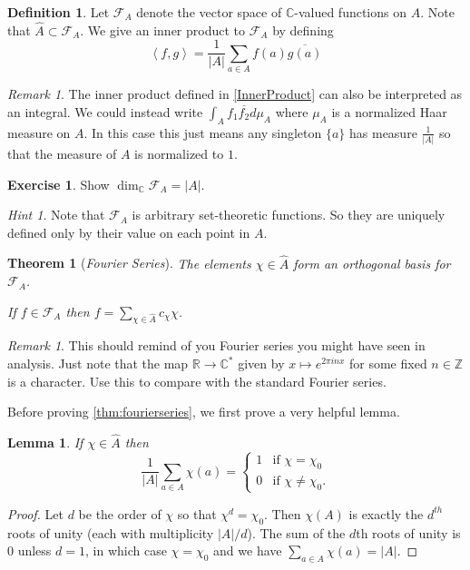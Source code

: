 \documentclass[11pt]{article}
\newcommand{\BB}[1]{\mathbb{#1}} %
\newcommand{\script}[1]{\mathcal{#1}} %
\newcommand{\free}[1]{\left\langle#1\right\rangle} %
\newcommand{\CC}{\BB{C}}
\newcommand{\RR}{\BB{R}}
\newcommand{\ZZ}{\BB{Z}}
\newcommand{\sF}{\script{F}}
\renewcommand{\hat}{\widehat}
\theoremstyle{plain}
\newtheorem{thm}[theoremCounter]{Theorem}
\newtheorem{lem}[lemmaCounter]{Lemma}
\theoremstyle{definition}
\newtheorem{defn}[definitionCounter]{Definition}
\newtheorem{excer}[exerciseCounter]{Exercise}
\theoremstyle{remark}
\newtheorem{rem}[remarkCounter]{Remark}
\newtheorem*{hint}{Hint}
\begin{document}
\begin{defn}\label{InnerProduct}
	Let $\sF_A$ denote the vector space of $\CC$-valued functions on $A$. Note that $\hat{A} \subset \sF_A$. We give an inner product to $\sF_A$ by defining
	$$
	\free{f,g} = \frac{1}{|A|}\sum_{a\in A}f(a)\overline{g(a)}
	$$
\end{defn}

\begin{rem}
	The inner product defined in \autoref{InnerProduct} can also be interpreted as an integral. We could instead write $\int_Af_1\overline{f_2}d\mu_A$ where $\mu_A$ is a normalized Haar measure on $A$. In this case this just means any singleton $\{a\}$ has measure $\frac{1}{|A|}$ so that the measure of $A$ is normalized to $1$.
\end{rem}

\begin{excer}\label{ex:dimsF_A}
	Show $\dim_\CC\sF_A = |A|$.
	\begin{hint}
		Note that $\sF_A$ is arbitrary set-theoretic functions. So they are uniquely defined only by their value on each point in $A$.
	\end{hint}
\end{excer}

\begin{thm}[\emph{Fourier Series}]\label{thm:fourierseries}
	The elements $\chi\in\hat{A}$ form an orthogonal basis for $\sF_A$.

	If $f\in\sF_A$ then $f = \sum\limits_{\chi\in\hat{A}}c_{\chi}\chi$.
\end{thm}

\begin{rem}
	This should remind of you Fourier series you might have seen in analysis. Just note that the map $\RR\to\CC^*$ given by $x\mapsto e^{2\pi i n x}$ for some fixed $n\in\ZZ$ is a character. Use this to compare with the standard Fourier series.
\end{rem}

Before proving \autoref{thm:fourierseries}, we first prove a very helpful lemma.

\begin{lem}\label{lem:ortholemma}
	If $\chi\in\hat{A}$ then
	$$
	\frac{1}{|A|}\sum_{a\in A}\chi(a) =
	\begin{cases}
		1 &\text{if $\chi=\chi_0$}
		\\
		0 &\text{if $\chi\neq\chi_0$.}
	\end{cases}
	$$
\end{lem}
\begin{proof}
	Let $d$ be the order of $\chi$ so that $\chi^d = \chi_0$. Then $\chi(A)$ is exactly the $d^{th}$ roots of unity (each with multiplicity $|A|/d$). The sum of the $d$th roots of unity is $0$ unless $d=1$, in which case $\chi=\chi_0$ and we have $\sum_{a\in A}\chi(a) = |A|$.
\end{proof}
\end{document}
